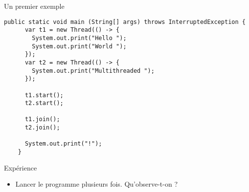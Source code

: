 
\begingroup

\begin{frame}[fragile]{Un premier exemple}

  \begin{lstlisting}[gobble=4]
    public static void main (String[] args) throws InterruptedException {
      var t1 = new Thread(() -> {
        System.out.print("Hello ");
        System.out.print("World ");
      });
      var t2 = new Thread(() -> {
        System.out.print("Multithreaded ");
      });
      
      t1.start();
      t2.start();

      t1.join();
      t2.join();

      System.out.print("!");
    }
  \end{lstlisting}

  \begin{block}{Expérience}
    \begin{itemize}
    \item Lancer le programme plusieurs fois. Qu'observe-t-on ? 
    \end{itemize}
  \end{block}

  
\end{frame}

\endgroup
\endinput
